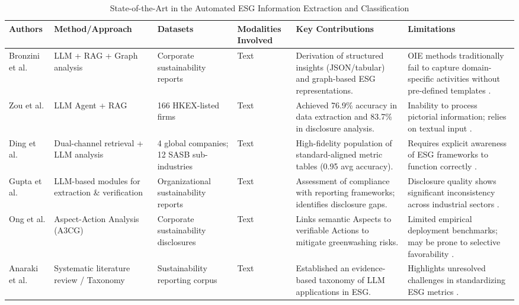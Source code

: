 \begin{landscape}
\begin{table}[p]
\centering
\caption{State-of-the-Art in the Automated ESG Information Extraction and Classification}
\label{tab:automated-esg-extraction-classification}
\small
\renewcommand{\arraystretch}{1.2}
\begin{tabularx}{\linewidth}{|p{1.8cm}|X|X|p{1.8cm}|X|X|}
\hline
Authors & Method/Approach & Datasets & Modalities Involved & Key Contributions & Limitations \\ \hline
Bronzini et al.  \parencite{marco_bronzini_bf94d949} & LLM + RAG + Graph analysis & Corporate sustainability reports & Text & Derivation of structured insights (JSON/tabular) and graph-based ESG representations. & OIE methods traditionally fail to capture domain-specific activities without pre-defined templates  \parencite{marco_bronzini_bf94d949}. \\ \hline
Zou et al.  \parencite{yi_zou_37c055f7} & LLM Agent + RAG & 166 HKEX-listed firms & Text & Achieved 76.9\% accuracy in data extraction and 83.7\% in disclosure analysis. & Inability to process pictorial information; relies on textual input  \parencite{yi_zou_37c055f7}. \\ \hline
Ding et al.  \parencite{yi_ding_136f177b} & Dual-channel retrieval + LLM analysis & 4 global companies; 12 SASB sub-industries & Text & High-fidelity population of standard-aligned metric tables (0.95 avg accuracy). & Requires explicit awareness of ESG frameworks to function correctly  \parencite{yi_ding_136f177b}. \\ \hline
Gupta et al.  \parencite{tanay_gupta_b5c91517} & LLM-based modules for extraction \& verification & Organizational sustainability reports & Text & Assessment of compliance with reporting frameworks; identifies disclosure gaps. & Disclosure quality shows significant inconsistency across industrial sectors  \parencite{tanay_gupta_b5c91517}. \\ \hline
Ong et al.  \parencite{keane_ong_369a0b63} & Aspect-Action Analysis (A3CG) & Corporate sustainability disclosures & Text & Links semantic Aspects to verifiable Actions to mitigate greenwashing risks. & Limited empirical deployment benchmarks; may be prone to selective favorability  \parencite{keane_ong_369a0b63}. \\ \hline
Anaraki et al.  \parencite{seyed_alireza_mousavian_anaraki_b56a1c0f} & Systematic literature review / Taxonomy & Sustainability reporting corpus & Text & Established an evidence-based taxonomy of LLM applications in ESG. & Highlights unresolved challenges in standardizing ESG metrics  \parencite{seyed_alireza_mousavian_anaraki_b56a1c0f}. \\ \hline

\end{tabularx}
\end{table}
\end{landscape}
